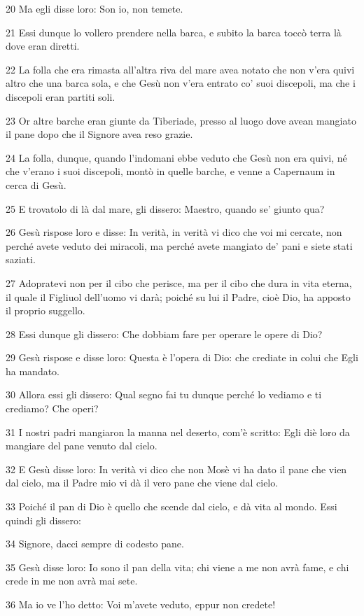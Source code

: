 \par 20 Ma egli disse loro: Son io, non temete.
\par 21 Essi dunque lo vollero prendere nella barca, e subito la barca toccò terra là dove eran diretti.
\par 22 La folla che era rimasta all'altra riva del mare avea notato che non v'era quivi altro che una barca sola, e che Gesù non v'era entrato co' suoi discepoli, ma che i discepoli eran partiti soli.
\par 23 Or altre barche eran giunte da Tiberiade, presso al luogo dove avean mangiato il pane dopo che il Signore avea reso grazie.
\par 24 La folla, dunque, quando l'indomani ebbe veduto che Gesù non era quivi, né che v'erano i suoi discepoli, montò in quelle barche, e venne a Capernaum in cerca di Gesù.
\par 25 E trovatolo di là dal mare, gli dissero: Maestro, quando se' giunto qua?
\par 26 Gesù rispose loro e disse: In verità, in verità vi dico che voi mi cercate, non perché avete veduto dei miracoli, ma perché avete mangiato de' pani e siete stati saziati.
\par 27 Adopratevi non per il cibo che perisce, ma per il cibo che dura in vita eterna, il quale il Figliuol dell'uomo vi darà; poiché su lui il Padre, cioè Dio, ha apposto il proprio suggello.
\par 28 Essi dunque gli dissero: Che dobbiam fare per operare le opere di Dio?
\par 29 Gesù rispose e disse loro: Questa è l'opera di Dio: che crediate in colui che Egli ha mandato.
\par 30 Allora essi gli dissero: Qual segno fai tu dunque perché lo vediamo e ti crediamo? Che operi?
\par 31 I nostri padri mangiaron la manna nel deserto, com'è scritto: Egli diè loro da mangiare del pane venuto dal cielo.
\par 32 E Gesù disse loro: In verità vi dico che non Mosè vi ha dato il pane che vien dal cielo, ma il Padre mio vi dà il vero pane che viene dal cielo.
\par 33 Poiché il pan di Dio è quello che scende dal cielo, e dà vita al mondo. Essi quindi gli dissero:
\par 34 Signore, dacci sempre di codesto pane.
\par 35 Gesù disse loro: Io sono il pan della vita; chi viene a me non avrà fame, e chi crede in me non avrà mai sete.
\par 36 Ma io ve l'ho detto: Voi m'avete veduto, eppur non credete!
